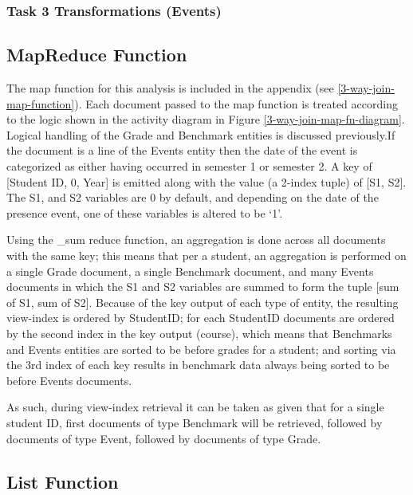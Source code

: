 \subsubsection{Task 3 Transformations (Events)}

\subsection{MapReduce Function}
The map function for this analysis is included in the appendix (see \ref{3-way-join-map-function}). Each document passed to the map function is treated according to the logic shown in the activity diagram in Figure \ref{3-way-join-map-fn-diagram}. Logical handling of the Grade and Benchmark entities is discussed previously.If the document is a line of the Events entity then the date of the event is categorized as either having occurred in semester 1 or semester 2. A key of [Student ID, 0, Year] is emitted along with the value (a 2-index tuple) of [S1, S2]. The S1, and S2 variables are 0 by default, and depending on the date of the presence event, one of these variables is altered to be `1'.

Using the \_sum reduce function, an aggregation is done across all documents with the same key; this means that per a student, an aggregation is performed on a single Grade document, a single Benchmark document, and many Events documents in which the S1 and S2 variables are summed to form the tuple [sum of S1, sum of S2]. Because of the key output of each type of entity, the resulting view-index is ordered by StudentID; for each StudentID documents are ordered by the second index in the key output (course), which means that Benchmarks and Events entities are sorted to be before grades for a student; and sorting via the 3rd index of each key results in benchmark data always being sorted to be before Events documents.



As such, during view-index retrieval it can be taken as given that for a single student ID, first documents of type Benchmark will be retrieved, followed by documents of type Event, followed by documents of type Grade.

\subsection{List Function}





















